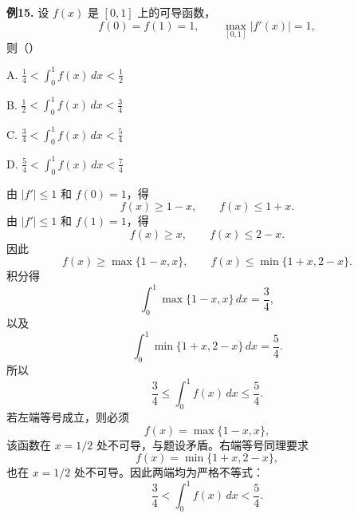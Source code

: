 \begin{problemblock}
\textbf{例15.} 设 \(f(x)\) 是 \([0,1]\) 上的可导函数，
\[
f(0)=f(1)=1,\qquad \max_{[0,1]}|f'(x)|=1,
\]
则（\quad）

A. \(\displaystyle \frac14<\int_0^1 f(x)\,dx<\frac12\)

B. \(\displaystyle \frac12<\int_0^1 f(x)\,dx<\frac34\)

C. \(\displaystyle \frac34<\int_0^1 f(x)\,dx<\frac54\)

D. \(\displaystyle \frac54<\int_0^1 f(x)\,dx<\frac74\)
\end{problemblock}
\begin{solutionblock}
由 \(|f'|\le1\) 和 \(f(0)=1\)，得
\[
f(x)\ge1-x,\qquad f(x)\le1+x.
\]
由 \(|f'|\le1\) 和 \(f(1)=1\)，得
\[
f(x)\ge x,\qquad f(x)\le2-x.
\]
因此
\[
f(x)\ge\max\{1-x,x\},
\qquad
f(x)\le\min\{1+x,2-x\}.
\]
积分得
\[
\int_0^1\max\{1-x,x\}\,dx=\frac34,
\]
以及
\[
\int_0^1\min\{1+x,2-x\}\,dx=\frac54.
\]
所以
\[
\frac34\le\int_0^1f(x)\,dx\le\frac54.
\]
若左端等号成立，则必须
\[
f(x)=\max\{1-x,x\},
\]
该函数在 \(x=1/2\) 处不可导，与题设矛盾。右端等号同理要求
\[
f(x)=\min\{1+x,2-x\},
\]
也在 \(x=1/2\) 处不可导。因此两端均为严格不等式：
\[
\frac34<\int_0^1f(x)\,dx<\frac54.
\]
\end{solutionblock}
